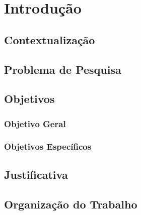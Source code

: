 \chapter{Introdução}\label{cap:introducao}
\section{Contextualização}
\section{Problema de Pesquisa}
\section{Objetivos}
\subsection{Objetivo Geral}
\subsection{Objetivos Específicos}
\section{Justificativa}
\section{Organização do Trabalho}